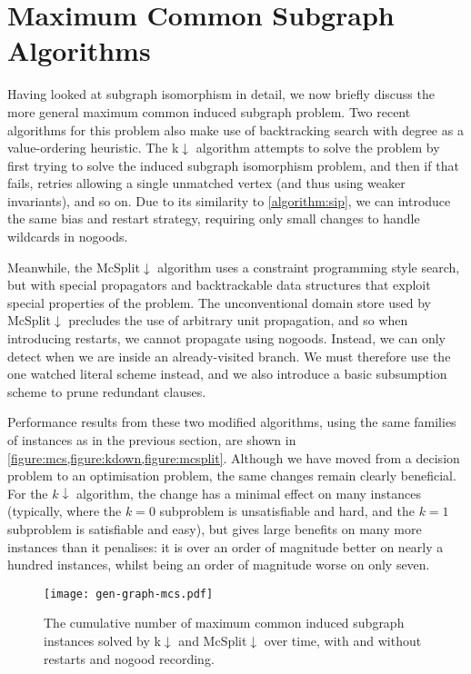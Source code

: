 \documentclass[letterpaper]{article} %
\begin{document}
\section{Maximum Common Subgraph Algorithms}

Having looked at subgraph isomorphism in detail, we now briefly discuss the more general maximum
common induced subgraph problem.  Two recent algorithms for this problem also make use of
backtracking search with degree as a value-ordering heuristic. The k${\downarrow}$ algorithm
\cite{DBLP:conf/aaai/HoffmannMR17} attempts to solve the problem by first trying to solve the
induced subgraph isomorphism problem, and then if that fails, retries allowing a single unmatched
vertex (and thus using weaker invariants), and so on. Due to its similarity to \cref{algorithm:sip},
we can introduce the same bias and restart strategy, requiring only small changes
to handle wildcards in nogoods.

Meanwhile, the McSplit${\downarrow}$ algorithm
\cite{DBLP:conf/ijcai/McCreeshPT17} uses a constraint programming style search, but with special
propagators and backtrackable data structures that exploit special properties of the problem. The
unconventional domain store used by McSplit${\downarrow}$ precludes the use of arbitrary unit
propagation, and so when introducing restarts, we cannot propagate using nogoods.  Instead, we can
only detect when we are inside an already-visited branch.  We must therefore use the one watched
literal scheme instead, and we also introduce a basic subsumption scheme to prune redundant clauses.

Performance results from these two modified algorithms, using the same families of instances as in
the previous section, are shown in \cref{figure:mcs,figure:kdown,figure:mcsplit}. Although we have
moved from a decision problem to an optimisation problem, the same changes remain clearly
beneficial. For the $k{\downarrow}$ algorithm, the change has a minimal effect on many instances
(typically, where the $k = 0$ subproblem is unsatisfiable and hard, and the $k = 1$ subproblem is
satisfiable and easy), but gives large benefits on many more instances than it penalises: it is over
an order of magnitude better on nearly a hundred instances, whilst being an order of magnitude worse
on only seven.

\begin{figure}[p]
    \centering
    \texttt{[image: gen-graph-mcs.pdf]}
    \caption{The cumulative number of maximum common induced subgraph instances solved by
    k${\downarrow}$ and McSplit${\downarrow}$ over time, with and without restarts and nogood
    recording.}\label{figure:mcs}
\end{figure}
\end{document}
